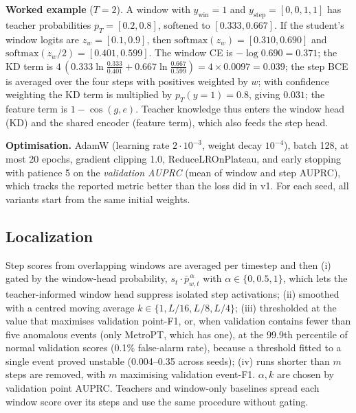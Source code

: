 \documentclass[twoside,english]{article}
\begin{document}
\textbf{Worked example} ($T=2$). A window with $y_{\mathrm{win}}=1$ and $y_{\mathrm{step}}=[0,0,1,1]$ has teacher probabilities $p_T=[0.2,0.8]$, softened to $[0.333,0.667]$. If the student's window logits are $z_w=[0.1,0.9]$, then $\mathrm{softmax}(z_w)=[0.310,0.690]$ and $\mathrm{softmax}(z_w/2)=[0.401,0.599]$. The window CE is $-\log 0.690=0.371$; the KD term is $4\,(0.333\ln\tfrac{0.333}{0.401}+0.667\ln\tfrac{0.667}{0.599})=4\times0.0097=0.039$; the step BCE is averaged over the four steps with positives weighted by $w$; with confidence weighting the KD term is multiplied by $p_T(y{=}1)=0.8$, giving $0.031$; the feature term is $1-\cos(g,e)$. Teacher knowledge thus enters the window head (KD) and the shared encoder (feature term), which also feeds the step head.

\textbf{Optimisation.} AdamW (learning rate $2\cdot10^{-3}$, weight decay $10^{-4}$), batch 128, at most 20 epochs, gradient clipping 1.0, ReduceLROnPlateau, and early stopping with patience 5 on the \emph{validation AUPRC} (mean of window and step AUPRC), which tracks the reported metric better than the loss did in v1. For each seed, all variants start from the same initial weights.

\subsection{Localization}
Step scores from overlapping windows are averaged per timestep and then (i) gated by the window-head probability, $s_t\cdot \bar p_{w,t}^{\,\alpha}$ with $\alpha\in\{0,0.5,1\}$, which lets the teacher-informed window head suppress isolated step activations; (ii) smoothed with a centred moving average $k\in\{1,L/16,L/8,L/4\}$; (iii) thresholded at the value that maximises validation point-F1, or, when validation contains fewer than five anomalous events (only MetroPT, which has one), at the 99.9th percentile of normal validation scores (0.1\% false-alarm rate), because a threshold fitted to a single event proved unstable (0.004--0.35 across seeds); (iv) runs shorter than $m$ steps are removed, with $m$ maximising validation event-F1. $\alpha,k$ are chosen by validation point AUPRC. Teachers and window-only baselines spread each window score over its steps and use the same procedure without gating.
\end{document}
